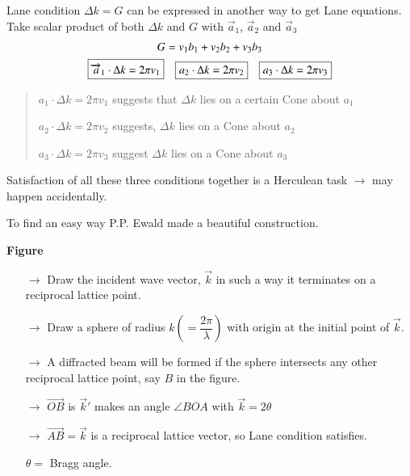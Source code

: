 Lane condition $\Delta k=G$ can be expressed in another way to get Lane equations. Take scalar product of both $\Delta k$ and $G$ with $\overrightarrow{a}_{1}$, $\overrightarrow{a}_{2}$ and $\overrightarrow{a}_{3}$
\begin{gather*}
G=v_{1}b_{1}+v_{2}b_{2}+v_{3}b_{3}\\
\fbox{$\overrightarrow{a}_{1}\cdot \Delta k=2\pi v_{1}$}\quad \fbox{$a_{2}\cdot \Delta k=2\pi v_{2}$}\quad \fbox{$a_{3}\cdot \Delta k=2\pi v_{3}$}
\end{gather*}
\begin{quote}
$a_{1}\cdot \Delta k=2\pi v_{1}$ suggests that $\Delta k$ lies on a certain Cone about $a_{1}$

$a_{2}\cdot \Delta k=2\pi v_{2}$ suggests, $\Delta k$ lies on a Cone about $a_{2}$

$a_{3}\cdot \Delta k=2\pi v_{3}$ suggest $\Delta k$ lies on a Cone about $a_{3}$
\end{quote}
Satisfaction of all these three conditions together is a Herculean task $\to$ may happen accidentally.

To find an easy way P.P. Ewald made a beautiful construction.
\begin{center}
{\bf Figure}
\end{center}
\begin{itemize}
\item[$\to$] Draw the incident wave vector, $\overrightarrow{k}$ in such a way it terminates on a reciprocal lattice point.

\item[$\to$] Draw a sphere of radius $k\left(=\dfrac{2\pi}{\lambda}\right)$ with origin at the initial point of $\overrightarrow{k}$.

\item[$\to$] A diffracted beam will be formed if the sphere intersects any other reciprocal lattice point, say $B$ in the figure. 

\item[$\to$] $\overrightarrow{OB}$ is $\overrightarrow{k}'$ makes an angle $\angle{BOA}$ with $\overrightarrow{k}=2\theta$

\item[$\to$] $\overrightarrow{AB}=\overrightarrow{k}$ is a reciprocal lattice vector, so Lane condition satisfies.

\quad $\theta=$ Bragg angle.
\end{itemize}

